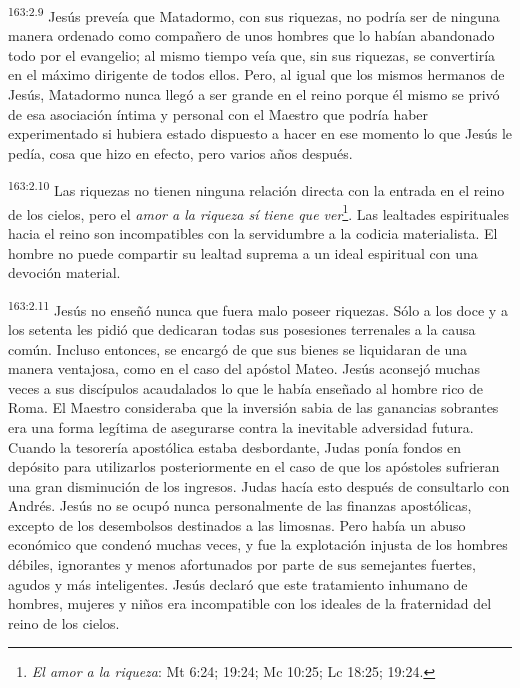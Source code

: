\par 
\textsuperscript{163:2.9} Jesús preveía que Matadormo, con sus riquezas, no podría ser de ninguna manera ordenado como compañero de unos hombres que lo habían abandonado todo por el evangelio; al mismo tiempo veía que, sin sus riquezas, se convertiría en el máximo dirigente de todos ellos. Pero, al igual que los mismos hermanos de Jesús, Matadormo nunca llegó a ser grande en el reino porque él mismo se privó de esa asociación íntima y personal con el Maestro que podría haber experimentado si hubiera estado dispuesto a hacer en ese momento lo que Jesús le pedía, cosa que hizo en efecto, pero varios años después.

\par 
\textsuperscript{163:2.10} Las riquezas no tienen ninguna relación directa con la entrada en el reino de los cielos, pero el \textit{amor a la riqueza sí tiene que ver}\footnote{\textit{El amor a la riqueza}: Mt 6:24; 19:24; Mc 10:25; Lc 18:25; 19:24.}. Las lealtades espirituales hacia el reino son incompatibles con la servidumbre a la codicia materialista. El hombre no puede compartir su lealtad suprema a un ideal espiritual con una devoción material.

\par 
\textsuperscript{163:2.11} Jesús no enseñó nunca que fuera malo poseer riquezas. Sólo a los doce y a los setenta les pidió que dedicaran todas sus posesiones terrenales a la causa común. Incluso entonces, se encargó de que sus bienes se liquidaran de una manera ventajosa, como en el caso del apóstol Mateo. Jesús aconsejó muchas veces a sus discípulos acaudalados lo que le había enseñado al hombre rico de Roma. El Maestro consideraba que la inversión sabia de las ganancias sobrantes era una forma legítima de asegurarse contra la inevitable adversidad futura. Cuando la tesorería apostólica estaba desbordante, Judas ponía fondos en depósito para utilizarlos posteriormente en el caso de que los apóstoles sufrieran una gran disminución de los ingresos. Judas hacía esto después de consultarlo con Andrés. Jesús no se ocupó nunca personalmente de las finanzas apostólicas, excepto de los desembolsos destinados a las limosnas. Pero había un abuso económico que condenó muchas veces, y fue la explotación injusta de los hombres débiles, ignorantes y menos afortunados por parte de sus semejantes fuertes, agudos y más inteligentes. Jesús declaró que este tratamiento inhumano de hombres, mujeres y niños era incompatible con los ideales de la fraternidad del reino de los cielos.


